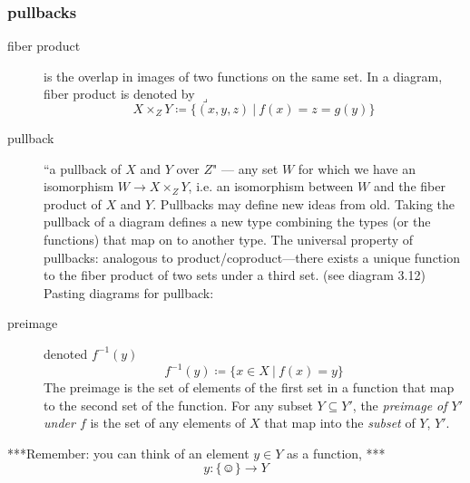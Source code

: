 \documentclass{article}
\begin{document}
\subsubsection{pullbacks}
\begin{description}
\item[fiber product] is the overlap in images of two functions on the same set. In a diagram, fiber product is denoted by $\lrcorner$
\begin{equation*}
X \times_Z Y \coloneqq \{ (x,y,z)\ |\ f(x) = z = g(y) \}
\end{equation*}
\item[pullback]``a pullback of $X$ and $Y$ over $Z$" --- any set $W$ for which we have an isomorphism $W \rightarrow X \times_Z Y$, i.e. an isomorphism between $W$ and the fiber product of $X$ and $Y$.
Pullbacks may define new ideas from old. Taking the pullback of a diagram defines a new type combining the types (or the functions) that map on to another type.
The universal property of pullbacks: analogous to product/coproduct---there exists a unique function to the fiber product of two sets under a third set. (see diagram 3.12)
Pasting diagrams for pullback:
\begin{equation}
\end{equation}
\item[preimage] denoted $f^{-1}(y)$
\begin{equation*}
f^{-1}(y) \coloneqq \{ x \in X\ |\ f(x) = y \}
\end{equation*}
The preimage is the set of elements of the first set in a function that map to the second set of the function.
For any subset $Y \subseteq Y'$, the \emph{preimage of $Y'$ under $f$} is the set of any elements of $X$ that map into the \emph{subset} of $Y$, $Y'$.
\end{description}
***Remember: you can think of an element $y \in Y$ as a function, ***
\begin{equation*}
y: \{ \smiley \} \rightarrow Y
\end{equation*}
\end{document}
